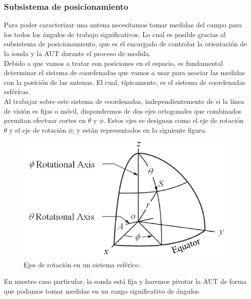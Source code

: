 \documentclass{article}
\begin{document}
\newpage

\subsubsection{Subsistema de posicionamiento} 

Para poder caracterizar una antena necesitamos tomar medidas del campo para los todos los ángulos de trabajo significativos. Lo cual es posible gracias al subsistema de posicionamiento, que es el encargado de controlar la orientación de la sonda y la AUT durante el proceso de medida.
\\

Debido a que vamos a tratar con posiciones en el espacio, es fundamental determinar el sistema de coordenadas que vamos a usar para asociar las medidas con la posición de las antenas. El cual, típicamente, es el sistema de coordenadas esféricas.
\\

Al trabajar sobre este sistema de coordenadas, independientemente de si la línea de visión es fijas o móvil, dispondremos de dos ejes ortogonales que combinados permitan efectuar cortes en $\theta$ y $\phi$. Estos ejes se designan como el eje de rotación $\theta$ y el eje de rotación $\phi$; y están representados en la siguiente figura. 

\begin{figure}[h]
    \centering
    \includegraphics[scale=0.5]{Figura6-Ejes ortogonales para medir antenas}
    \caption{Ejes de rotación en un sistema esférico.}
    \label{Ejes-ortogonales-para-medir-antenas}
\end{figure} 

En nuestro caso particular, la sonda está fija y haremos pivotar la AUT de forma que podamos tomar medidas en un rango significativo de ángulos.
\end{document}
